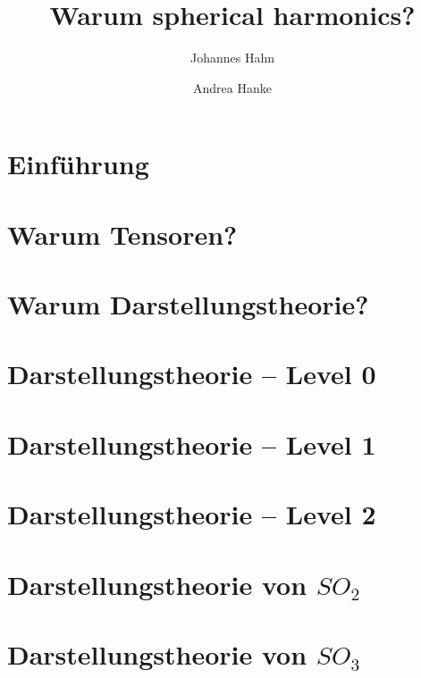 \documentclass[fontsize=11pt,fleqn,a4paper]{scrartcl}
\author{Johannes Hahn \and Andrea Hanke}
\title{Warum spherical harmonics?}
\begin{document}
\maketitle

\tableofcontents

\setcounter{section}{-1}
\section{Einführung}

\section{Warum Tensoren?}



\section{Warum Darstellungstheorie?}




\section{Darstellungstheorie -- Level 0}



\section{Darstellungstheorie -- Level 1}



\section{Darstellungstheorie -- Level 2}

\section{Darstellungstheorie \texorpdfstring{von $SO_2$}{der zweidimensionalen Drehgruppe}}
\section{Darstellungstheorie \texorpdfstring{von $SO_3$}{der dreidimensionalen Drehgruppe}}
\end{document}
